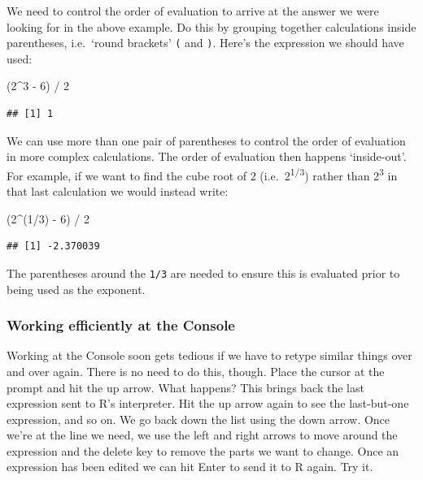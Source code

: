 \documentclass[
]{book}
\newenvironment{Shaded}{\begin{snugshade}}{\end{snugshade}}
\newcommand{\DecValTok}[1]{\textcolor[rgb]{0.00,0.00,0.81}{#1}}
\newcommand{\NormalTok}[1]{#1}
\newcommand{\SpecialCharTok}[1]{\textcolor[rgb]{0.00,0.00,0.00}{#1}}
\newenvironment{greybox}{
  \definecolor{shadecolor}{rgb}{0.95,0.95,0.95}  %
  \color{black}
  \begin{shaded}}
 {\end{shaded}}
\newenvironment{infobox}[1]
  {
  \begin{itemize}
  \renewcommand{\labelitemi}{
    \raisebox{-.7\height}[0pt][0pt]{
      {\setkeys{Gin}{width=3em,keepaspectratio}
        \texttt{[image: images/\#1]}}
    }
  }
  \setlength{\fboxsep}{1em}
  \begin{greybox}
  \item
  }
  {
  \end{greybox}
  \end{itemize}
  }
\begin{document}
We need to control the order of evaluation to arrive at the answer we were looking for in the above example. Do this by grouping together calculations inside parentheses, i.e.~`round brackets' \texttt{(} and \texttt{)}. Here's the expression we should have used:

\begin{Shaded}
\begin{Highlighting}[]
\NormalTok{(}\DecValTok{2}\SpecialCharTok{\^{}}\DecValTok{3} \SpecialCharTok{{-}} \DecValTok{6}\NormalTok{) }\SpecialCharTok{/} \DecValTok{2}
\end{Highlighting}
\end{Shaded}

\begin{verbatim}
## [1] 1
\end{verbatim}

We can use more than one pair of parentheses to control the order of evaluation in more complex calculations. The order of evaluation then happens `inside-out'. For example, if we want to find the cube root of 2 (i.e.~2\textsuperscript{1/3}) rather than 2\textsuperscript{3} in that last calculation we would instead write:

\begin{Shaded}
\begin{Highlighting}[]
\NormalTok{(}\DecValTok{2}\SpecialCharTok{\^{}}\NormalTok{(}\DecValTok{1}\SpecialCharTok{/}\DecValTok{3}\NormalTok{) }\SpecialCharTok{{-}} \DecValTok{6}\NormalTok{) }\SpecialCharTok{/} \DecValTok{2}
\end{Highlighting}
\end{Shaded}

\begin{verbatim}
## [1] -2.370039
\end{verbatim}

The parentheses around the \texttt{1/3} are needed to ensure this is evaluated prior to being used as the exponent.

\begin{infobox}{action}

\hypertarget{working-efficiently-at-the-console}{%
\subsubsection*{Working efficiently at the Console}\label{working-efficiently-at-the-console}}

Working at the Console soon gets tedious if we have to retype similar things over and over again. There is no need to do this, though. Place the cursor at the prompt and hit the up arrow. What happens? This brings back the last expression sent to R's interpreter. Hit the up arrow again to see the last-but-one expression, and so on. We go back down the list using the down arrow. Once we're at the line we need, we use the left and right arrows to move around the expression and the delete key to remove the parts we want to change. Once an expression has been edited we can hit Enter to send it to R again. Try it.

\end{infobox}
\end{document}
